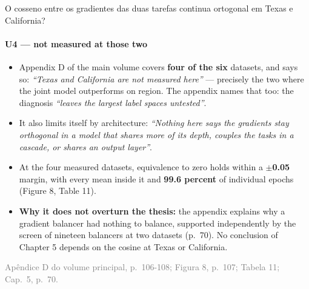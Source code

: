 \documentclass{beamer}
\begin{document}
\begin{frame}[noframenumbering]{O cosseno entre os gradientes das duas tarefas continua ortogonal em Texas e California?}
    \framesubtitle{U4 --- not measured at those two}
    \hypertarget{u4}{}
    \small
    \begin{itemize}\setlength{\itemsep}{0pt}\setlength{\parskip}{0pt}
        \item Appendix D of the main volume covers \textbf{four of the six} datasets, and says so: \textit{``Texas and California are not measured here''} --- precisely the two where the joint model outperforms on region. The appendix names that too: the diagnosis \textit{``leaves the largest label spaces untested''}.
        \item It also limits itself by architecture: \textit{``Nothing here says the gradients stay orthogonal in a model that shares more of its depth, couples the tasks in a cascade, or shares an output layer''}.
        \item At the four measured datasets, equivalence to zero holds within a \textbf{$\pm$0.05} margin, with every mean inside it and \textbf{99.6 percent} of individual epochs (Figure 8, Table 11).
        \item \textbf{Why it does not overturn the thesis:} the appendix explains why a gradient balancer had nothing to balance, supported independently by the screen of nineteen balancers at two datasets (p.~70). No conclusion of Chapter 5 depends on the cosine at Texas or California.
    \end{itemize}
    \vfill
    {\scriptsize
    \begin{minipage}[b]{0.775\linewidth}\raggedright\textcolor{gray}{Apêndice D do volume principal, p.~106-108; Figura 8, p.~107; Tabela 11; Cap.~5, p.~70.}\end{minipage}\hfill
    \begin{minipage}[b]{0.20\linewidth}\raggedleft \hyperlink{b0}{}\end{minipage}}
\end{frame}
\end{document}
